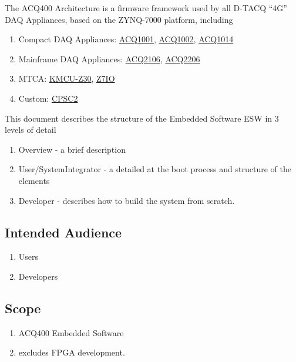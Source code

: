 \documentclass[]{article}
\begin{document}
The ACQ400 Architecture is a firmware framework used by all D-TACQ “4G” DAQ Appliances, based on the ZYNQ-7000 platform, including
\begin{enumerate}
	\item Compact DAQ Appliances: \href{https://www.d-tacq.com/acq1001Q.shtml}{ACQ1001}, \href{https://www.d-tacq.com/acq1002R.shtml}{ACQ1002}, \href{https://www.d-tacq.com/acq1014.shtml}{ACQ1014}
	\item Mainframe DAQ Appliances: \href{https://www.d-tacq.com/acq2106.shtml}{ACQ2106},  \href{https://www.d-tacq.com/acq2206.shtml}{ACQ2206}
	\item MTCA:  \href{https://www.d-tacq.com/mtca.shtml}{KMCU-Z30}, \href{https://innovation.desy.de/technologies/microtca/boards/damc_fmc1z7io/index_eng.html}{Z7IO}
	\item Custom: \href{https://www.d-tacq.com/news48.shtml}{CPSC2}
\end{enumerate}

This document describes the structure of the Embedded Software ESW in 3 levels of detail
\begin{enumerate}
    \item Overview - a brief description
    \item User/SystemIntegrator - a detailed at the boot process and structure of the elements
    \item Developer - describes how to build the system from scratch.
\end{enumerate}    

\subsection{Intended Audience}
\begin{enumerate}
    \item Users
    \item Developers
\end{enumerate}  

\subsection{Scope}
\begin{enumerate}
    \item ACQ400 Embedded Software
    \item excludes FPGA development.
\end{enumerate} 
\end{document}
